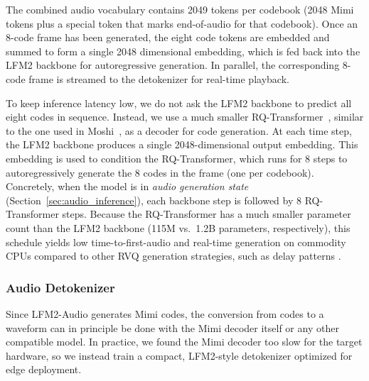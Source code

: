 \documentclass{article}
\begin{document}
The combined audio vocabulary contains 2049 tokens per codebook (2048 Mimi tokens plus a special token that marks end-of-audio for that codebook). Once an 8-code frame has been generated, the eight code tokens are embedded and summed to form a single 2048 dimensional embedding, which is fed back into the LFM2 backbone for autoregressive generation. In parallel, the corresponding 8-code frame is streamed to the detokenizer for real-time playback.

To keep inference latency low, we do not ask the LFM2 backbone to predict all eight codes in sequence. Instead, we use a much smaller RQ-Transformer~\citep{lee2022depthformer}, similar to the one used in Moshi~\citep{defossez2024moshi}, as a decoder for code generation. At each time step, the LFM2 backbone produces a single 2048-dimensional output embedding. This embedding is used to condition the RQ-Transformer, which runs for 8 steps to autoregressively generate the 8 codes in the frame (one per codebook). Concretely, when the model is in \emph{audio generation state} (Section~\ref{sec:audio_inference}), each backbone step is followed by 8 RQ-Transformer steps. Because the RQ-Transformer has a much smaller parameter count than the LFM2 backbone (115M vs.~1.2B parameters, respectively), this schedule yields low time-to-first-audio and real-time generation on commodity CPUs compared to other RVQ generation strategies, such as delay patterns \citep{copet2023musicgen}.


\subsubsection{Audio Detokenizer}
Since LFM2-Audio generates Mimi codes, the conversion from codes to a waveform can in principle be done with the Mimi decoder itself or any other compatible model. In practice, we found the Mimi decoder too slow for the target hardware, so we instead train a compact, LFM2-style detokenizer optimized for edge deployment.
\end{document}

